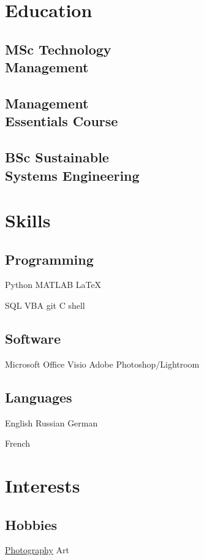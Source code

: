 \documentclass[]{plushcv}
\begin{document}
\begin{minipage}[t]{0.25\textwidth} 


\section{Education} 
	\subsection{MSc Technology\\ Management}
	\sectionsep
	
	\subsection{Management\\ Essentials Course}
	\sectionsep

	\subsection{BSc Sustainable\\Systems Engineering}
	\sectionsep


\section{Skills}
	\subsection{Programming}
	Python  \tb MATLAB \tb \LaTeX
	\subskip
	
	SQL  \tb VBA \tb git \tb C \tb shell 
	\sectionsep
	
	\subsection{Software}
	Microsoft Office \tb Visio \tb Adobe Photoshop/Lightroom
	\sectionsep
	
	\subsection{Languages}
	English \tb Russian \tb German
	\subskip
	
	French
	\sectionsep


\section{Interests}
	\subsection{Hobbies}
	\href{https://daniilaktanka.myportfolio.com/}{Photography} \tb Art

\end{minipage} 
\end{document}
